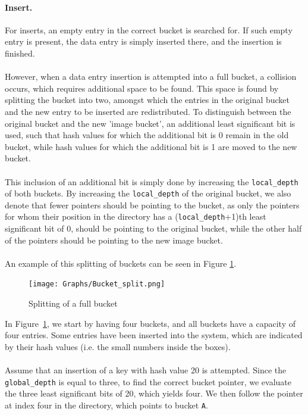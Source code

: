 \documentclass[11pt]{report} %
\begin{document}
\paragraph{Insert.} For inserts, an empty entry in the correct bucket is searched for. If such empty entry is present, the data entry is simply inserted there, and the insertion is finished. \\
\\
However, when a data entry insertion is attempted into a full bucket, a collision occurs, which requires additional space to be found. This space is found by splitting the bucket into two, amongst which the entries in the original bucket and the new entry to be inserted are redistributed. To distinguish between the original bucket and the new 'image bucket', an additional least significant bit is used, such that hash values for which the additional bit is 0 remain in the old bucket, while hash values for which the additional bit is 1 are moved to the new bucket. \\
\\
This inclusion of an additional bit is simply done by increasing the \verb|local_depth| of both buckets. By increasing the \verb|local_depth| of the original bucket, we also denote that fewer pointers should be pointing to the bucket, as only the pointers for whom their position in the directory has a (\verb|local_depth|+1)th least significant bit of 0, should be pointing to the original bucket, while the other half of the pointers should be pointing to the new image bucket.\\
\\
An example of this splitting of buckets can be seen in Figure \ref{fig:bucket_split}.
\begin{figure}[H]
  \centering
  \texttt{[image: Graphs/Bucket\_split.png]}
  \caption{Splitting of a full bucket}
  \label{fig:bucket_split}
\end{figure}
\noindent
In Figure~\ref{fig:bucket_split}, we start by having four buckets, and all buckets have a capacity of four entries. Some entries have been inserted into the system, which are indicated by their hash values (i.e. the small numbers inside the boxes). \\
\\
Assume that an insertion of a key with hash value 20 is attempted. Since the \verb|global_depth| is equal to three, to find the correct bucket pointer, we evaluate the three least significant bits of 20, which yields four. We then follow the pointer at index four in the directory, which points to bucket \verb|A|. \\
\end{document}
